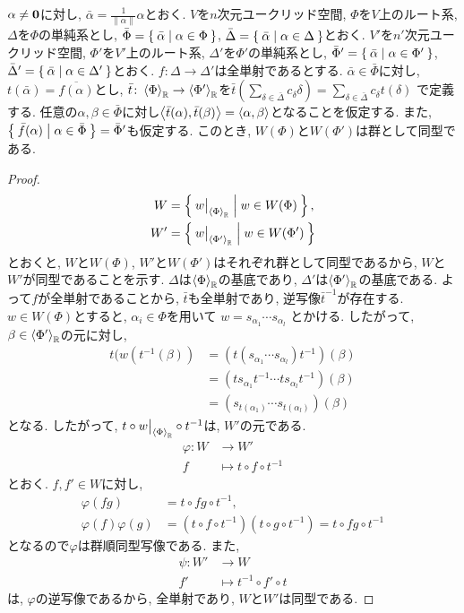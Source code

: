 \begin{prop}
  $\alpha\neq\boldsymbol{0}$に対し, $\bar\alpha=\frac{1}{\|\alpha\|}\alpha$とおく.
  $V$を$n$次元ユークリッド空間,
  $\Phi$を$V$上のルート系,
  $\Delta$を$\Phi$の単純系とし,
  $\bar\Phi=\Set{\bar\alpha|\alpha\in\Phi}$,
  $\bar\Delta=\Set{\bar\alpha|\alpha\in\Delta}$とおく.
  $V'$を$n'$次元ユークリッド空間,
  $\Phi'$を$V'$上のルート系,
  $\Delta'$を$\Phi'$の単純系とし,
  $\bar\Phi'=\Set{\bar\alpha|\alpha\in\Phi'}$,
  $\bar\Delta'=\Set{\bar\alpha|\alpha\in\Delta'}$とおく.
  $f\colon \Delta \to \Delta'$は全単射であるとする.
  $\bar\alpha\in \bar\Phi$に対し,
  $t(\bar\alpha)=\overline{f(\alpha)}$とし,
  $\bar t\colon \Braket{\Phi}_{\mathbb{R}}\to \Braket{\Phi'}_{\mathbb{R}}$を$\bar t(\sum_{\delta\in\bar\Delta}c_\delta \delta)=\sum_{\delta\in\bar\Delta}c_\delta t(\delta)$
  で定義する.
  任意の$\alpha,\beta\in \bar\Phi$に対し$\Braket{\bar t(\alpha),\bar t(\beta)}=\Braket{\alpha,\beta}$となることを仮定する.
  また, $\Set{\bar f(\alpha)|\alpha\in\bar\Phi}=\bar\Phi'$も仮定する.
  このとき, $W(\Phi)$と$W(\Phi')$は群として同型である.
\end{prop}
\begin{proof}
  \begin{align*}
  W&=\Set{w\bigr|_{\Braket{\Phi}_{\mathbb{R}}}|w\in W(\Phi)},\\
  W'&=\Set{w\bigr|_{\Braket{\Phi'}_{\mathbb{R}}}|w\in W(\Phi')}
  \end{align*}
  とおくと, $W$と$W(\Phi)$, $W'$と$W(\Phi')$はそれぞれ群として同型であるから,
  $W$と$W'$が同型であることを示す.
  $\Delta$は$\Braket{\Phi}_{\mathbb{R}}$の基底であり,
  $\Delta'$は$\Braket{\Phi'}_{\mathbb{R}}$の基底である.
  よって$f$が全単射であることから,
  $\bar t$も全単射であり,
  逆写像$\bar t^{-1}$が存在する.
  $w\in W(\Phi)$とすると,
  $\alpha_i\in \Phi$を用いて
  $w=s_{\alpha_1}\cdots s_{\alpha_l}$
  とかける.
  したがって, $\beta\in \Braket{\Phi'}_{\mathbb{R}}$の元に対し,
  \begin{align*}
    t(w(t^{-1}(\beta))
    &=(t(s_{\alpha_1}\cdots s_{\alpha_l})t^{-1})(\beta)\\
    &=(ts_{\alpha_1}t^{-1}\cdots t s_{\alpha_l}t^{-1})(\beta)\\
    &=(s_{t(\alpha_1)}\cdots s_{t(\alpha_l)})(\beta)
  \end{align*}
  となる.
  したがって,
  $t\circ w\bigr|_{\Braket{\Phi}_{\mathbb{R}}} \circ t^{-1}$は,
  $W'$の元である.
  \begin{align*}
    \varphi\colon W &\to W'\\
    f&\mapsto t\circ f \circ t^{-1} 
  \end{align*}
  とおく.
  $f,f'\in W$に対し,
  \begin{align*}
  \varphi(fg)&=t\circ fg \circ t^{-1},\\
  \varphi(f)\varphi(g)&=(t\circ f\circ t^{-1})( t\circ g \circ t^{-1})=t\circ fg \circ t^{-1}
  \end{align*}
  となるので$\varphi$は群順同型写像である.
  また,
  \begin{align*}
    \psi\colon W' &\to W\\
    f'&\mapsto t^{-1}\circ f' \circ t 
  \end{align*}
  は, $\varphi$の逆写像であるから,
  全単射であり, $W$と$W'$は同型である.
\end{proof}

